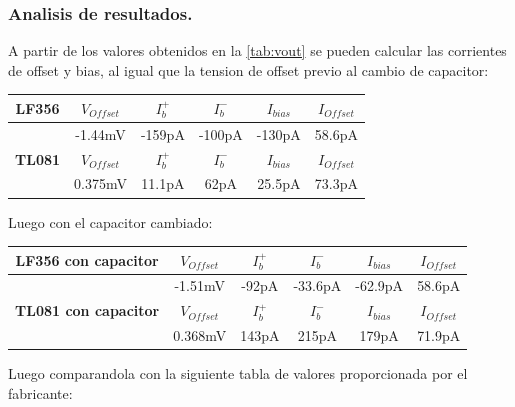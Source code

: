 \documentclass[a4paper]{article}
\begin{document}
\subsubsection{Analisis de resultados.}
A partir de los valores obtenidos en la   \ref{tab:vout} se pueden calcular las corrientes de offset y bias, al igual que la tension de offset previo al cambio de capacitor:
\begin{table}[H]
\begin{center}
\begin{tabular}{|c|c|c|c|c|c|}
\hline
\textbf{LF356} & \textbf{$V_{Offset}$} & \textbf{$I_b^+$} & \textbf{$I_b^-$} & \textbf{$I_{bias}$} & \textbf{$I_{Offset}$} \\ \hline
               & -1.44mV                & -159pA           & -100pA           & -130pA               & 58.6pA                 \\ \hline
\textbf{TL081} & \textbf{$V_{Offset}$} & \textbf{$I_b^+$} & \textbf{$I_b^-$} & \textbf{$I_{bias}$} & \textbf{$I_{Offset}$} \\ \hline
\textbf{}      & 0.375mV                & 11.1pA           & 62pA             & 25.5pA               & 73.3pA                 \\ \hline
\end{tabular}
\end{center}
\end{table}
Luego con el capacitor cambiado:
\begin{table}[H]
\begin{center}
\begin{tabular}{|c|c|c|c|c|c|}
\hline
\textbf{LF356 con capacitor} & \textbf{$V_{Offset}$} & \textbf{$I_b^+$} & \textbf{$I_b^-$} & \textbf{$I_{bias}$} & \textbf{$I_{Offset}$} \\ \hline
               & -1.51mV                & -92pA           & -33.6pA           & -62.9pA               & 58.6pA                 \\ \hline
\textbf{TL081 con capacitor} & \textbf{$V_{Offset}$} & \textbf{$I_b^+$} & \textbf{$I_b^-$} & \textbf{$I_{bias}$} & \textbf{$I_{Offset}$} \\ \hline
\textbf{}      & 0.368mV                & 143pA           & 215pA             & 179pA               & 71.9pA                 \\ \hline
\end{tabular}
\end{center}
\end{table}
Luego comparandola con la siguiente tabla de valores proporcionada por el fabricante:
\end{document}
